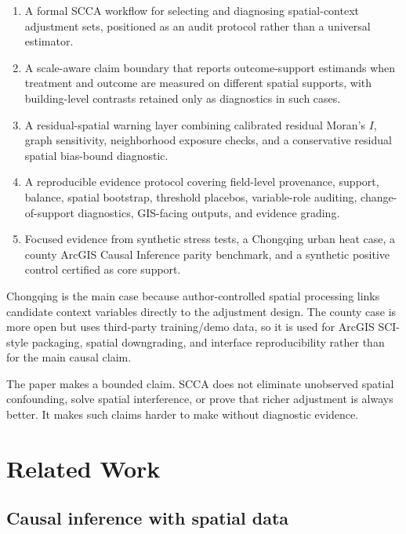 \documentclass{article}
\begin{document}
\begin{enumerate}
\item A formal SCCA workflow for selecting and diagnosing spatial-context adjustment sets, positioned as an audit protocol rather than a universal estimator.
\item A scale-aware claim boundary that reports outcome-support estimands when treatment and outcome are measured on different spatial supports, with building-level contrasts retained only as diagnostics in such cases.
\item A residual-spatial warning layer combining calibrated residual Moran's $I$, graph sensitivity, neighborhood exposure checks, and a conservative residual spatial bias-bound diagnostic.
\item A reproducible evidence protocol covering field-level provenance, support, balance, spatial bootstrap, threshold placebos, variable-role auditing, change-of-support diagnostics, GIS-facing outputs, and evidence grading.
\item Focused evidence from synthetic stress tests, a Chongqing urban heat case, a county ArcGIS Causal Inference parity benchmark, and a synthetic positive control certified as core support.
\end{enumerate}

Chongqing is the main case because author-controlled spatial processing links candidate context variables directly to the adjustment design. The county case is more open but uses third-party training/demo data, so it is used for ArcGIS SCI-style packaging, spatial downgrading, and interface reproducibility rather than for the main causal claim.

The paper makes a bounded claim. SCCA does not eliminate unobserved spatial confounding, solve spatial interference, or prove that richer adjustment is always better. It makes such claims harder to make without diagnostic evidence.


\section{Related Work}
\label{sec:related}

\subsection{Causal inference with spatial data}
\end{document}
